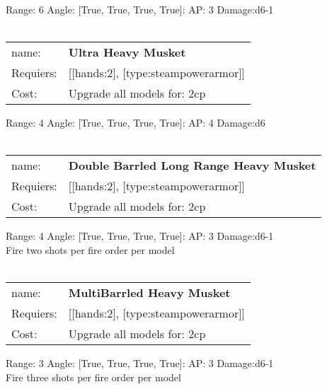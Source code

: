 Range: 6  Angle: [True, True, True, True]: AP: 3 Damage:d6-1 \\








\ \\
\begin{tabular}{ll}
name: & {\bf Ultra Heavy Musket } \\
Requiers: & [[hands:2], [type:steampowerarmor]] \\
Cost: & Upgrade all models for: 2cp \\
\end{tabular}



Range: 4  Angle: [True, True, True, True]: AP: 4 Damage:d6 \\








\ \\
\begin{tabular}{ll}
name: & {\bf Double Barrled Long Range Heavy Musket } \\
Requiers: & [[hands:2], [type:steampowerarmor]] \\
Cost: & Upgrade all models for: 2cp \\
\end{tabular}



Range: 4  Angle: [True, True, True, True]: AP: 3 Damage:d6-1 \\
Fire two shots per fire order per model\\ 








\ \\
\begin{tabular}{ll}
name: & {\bf MultiBarrled Heavy Musket } \\
Requiers: & [[hands:2], [type:steampowerarmor]] \\
Cost: & Upgrade all models for: 2cp \\
\end{tabular}



Range: 3  Angle: [True, True, True, True]: AP: 3 Damage:d6-1 \\
Fire three shots per fire order per model\\ 








